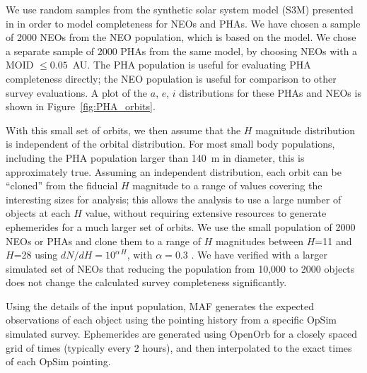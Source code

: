 We use random samples from the synthetic solar system model (S3M) presented in \cite{Grav2011} in order to model completeness for NEOs and PHAs. We have chosen a sample of 2000 NEOs from the \cite{Grav2011} NEO population, which is based on the \cite{Bottke2002} model. We chose a separate sample of 2000 PHAs from the same model, by choosing NEOs with a MOID $\le 0.05$~AU. The PHA population is useful for evaluating PHA completeness directly; the NEO population is useful for comparison to other survey evaluations. A plot of the $a$, $e$, $i$ distributions for these PHAs and NEOs is shown in Figure~\ref{fig:PHA_orbits}.

With this small set of orbits, we then assume that the $H$ magnitude distribution is independent of the orbital distribution. For most small body populations, including the PHA population larger than 140~m in diameter, this is approximately true. Assuming an independent distribution, each orbit can be ``cloned'' from the fiducial $H$ magnitude to a range of values covering the interesting sizes for analysis; this allows the analysis to use a large number of objects at each $H$ value, without requiring extensive resources to generate ephemerides for a much larger set of orbits. We use the small population of 2000 NEOs or PHAs and clone them to a range of $H$ magnitudes between $H$=11 and $H$=28 using $dN/dH = 10^{\alpha\, H}$, with $\alpha=0.3$ \citep{2017Icar..284..114S}. We have verified with a larger simulated set of NEOs that reducing the population from 10,000 to 2000 objects does not change the calculated survey completeness significantly.

Using the details of the input population, MAF generates the expected observations of each object using the pointing history
from a specific OpSim simulated survey. Ephemerides are generated using OpenOrb \citep{OpenOrb2009} for a closely spaced grid
of times (typically every 2 hours), and then interpolated to the exact times of each OpSim pointing.


